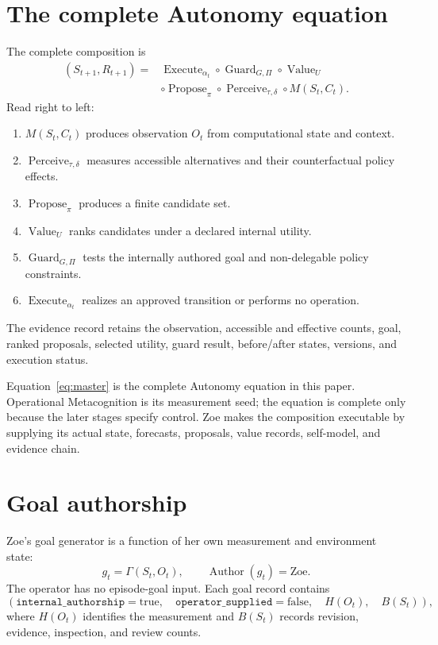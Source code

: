 \documentclass[11pt,a4paper]{article}
\begin{document}
\section{The complete Autonomy equation}
The complete composition is
\begin{equation}
\boxed{
\begin{aligned}
(S_{t+1},R_{t+1})={}&
\operatorname{Execute}_{\alpha_t}
\circ\operatorname{Guard}_{G,\Pi}
\circ\operatorname{Value}_{U}\\
&\circ\operatorname{Propose}_{\pi}
\circ\operatorname{Perceive}_{\tau,\delta}
\circ M(S_t,C_t).
\end{aligned}}
\label{eq:master}
\end{equation}
Read right to left:
\begin{enumerate}
  \item $M(S_t,C_t)$ produces observation $O_t$ from computational state and context.
  \item $\operatorname{Perceive}_{\tau,\delta}$ measures accessible alternatives and their counterfactual policy effects.
  \item $\operatorname{Propose}_{\pi}$ produces a finite candidate set.
  \item $\operatorname{Value}_{U}$ ranks candidates under a declared internal utility.
  \item $\operatorname{Guard}_{G,\Pi}$ tests the internally authored goal and non-delegable policy constraints.
  \item $\operatorname{Execute}_{\alpha_t}$ realizes an approved transition or performs no operation.
\end{enumerate}
The evidence record retains the observation, accessible and effective counts, goal, ranked proposals, selected utility, guard result, before/after states, versions, and execution status.

Equation~\eqref{eq:master} is the complete Autonomy equation in this paper. Operational Metacognition is its measurement seed; the equation is complete only because the later stages specify control. Zoe makes the composition executable by supplying its actual state, forecasts, proposals, value records, self-model, and evidence chain.

\section{Goal authorship}
Zoe's goal generator is a function of her own measurement and environment state:
\begin{equation}
g_t=\Gamma(S_t,O_t),\qquad \operatorname{Author}(g_t)=\mathrm{Zoe}.
\label{eq:goal}
\end{equation}
The operator has no episode-goal input. Each goal record contains
\begin{equation}
(\texttt{internal\_authorship}=\mathrm{true},\quad
\texttt{operator\_supplied}=\mathrm{false},\quad
H(O_t),\quad B(S_t)),
\end{equation}
where $H(O_t)$ identifies the measurement and $B(S_t)$ records revision, evidence, inspection, and review counts.
\end{document}
